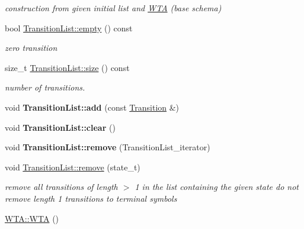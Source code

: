 \begin{DoxyCompactItemize}
\begin{DoxyCompactList}\small\item\em construction from given initial list and \mbox{\hyperlink{classWTA}{W\+TA}} (base schema) \end{DoxyCompactList}\item 
bool \mbox{\hyperlink{group__schemata_gaba83dbc74a223a80ad7f8776847bd6c2}{Transition\+List\+::empty}} () const
\begin{DoxyCompactList}\small\item\em zero transition \end{DoxyCompactList}\item 
size\+\_\+t \mbox{\hyperlink{group__schemata_gaa719dbdab17047360e889910795a07f2}{Transition\+List\+::size}} () const
\begin{DoxyCompactList}\small\item\em number of transitions. \end{DoxyCompactList}\item 
\mbox{\label{group__schemata_gadc77b77a90197483168626230fe4dbf4}} 
void {\bfseries Transition\+List\+::add} (const \mbox{\hyperlink{classTransition}{Transition}} \&)
\item 
\mbox{\label{group__schemata_ga2f4181b350f6dec7054072fcf2095834}} 
void {\bfseries Transition\+List\+::clear} ()
\item 
\mbox{\label{group__schemata_gad9709d189b3748d2285f2a3592bed2da}} 
void {\bfseries Transition\+List\+::remove} (Transition\+List\+\_\+iterator)
\item 
\mbox{\label{group__schemata_ga3c5b906f3ce72168effc16b06ed1ef6c}} 
void \mbox{\hyperlink{group__schemata_ga3c5b906f3ce72168effc16b06ed1ef6c}{Transition\+List\+::remove}} (state\+\_\+t)
\begin{DoxyCompactList}\small\item\em remove all transitions of length $>$ 1 in the list containing the given state do not remove length 1 transitions to terminal symbols \end{DoxyCompactList}\item 
\mbox{\label{group__schemata_ga5636da911ebbe8772c5444172d56800d}} 
\mbox{\hyperlink{group__schemata_ga5636da911ebbe8772c5444172d56800d}{W\+T\+A\+::\+W\+TA}} ()

\end{DoxyCompactItemize}
